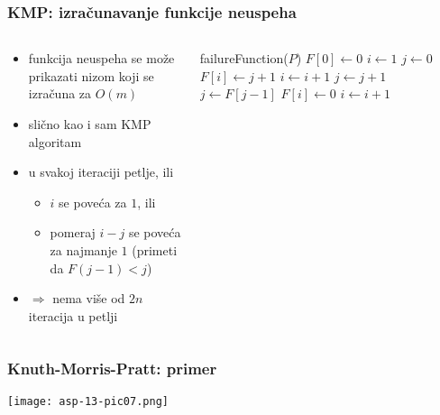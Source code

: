 \documentclass[compress,aspectratio=169]{beamer}
\begin{document}
\begin{frame}[fragile,shrink=12]
  \frametitle{KMP: izračunavanje funkcije neuspeha}
  \begin{columns}
    \begin{column}[t]{8cm}
      \begin{itemize}
        \item funkcija neuspeha se može prikazati nizom koji se izračuna za $O(m)$
        \item slično kao i sam KMP algoritam
        \item u svakoj iteraciji petlje, ili
        \begin{itemize}
          \item $i$ se poveća za $1$, ili
          \item pomeraj $i-j$ se poveća za najmanje $1$ (primeti da $F(j-1)<j$)
        \end{itemize}
        \item $\Rightarrow$ nema više od $2n$ iteracija u petlji
      \end{itemize}
    \end{column}
    \begin{column}[t]{8cm}
      \begin{algorithmic}
        \STATE failureFunction($P$)
        \STATE $F[0] \leftarrow 0$
        \STATE $i \leftarrow 1$
        \STATE $j \leftarrow 0$
            \STATE $F[i] \leftarrow j+1$ 
            \STATE $i \leftarrow i+1$
            \STATE $j \leftarrow j+1$
            \STATE $j \leftarrow F[j-1]$ 
          \ELSE
            \STATE $F[i] \leftarrow 0$ 
            \STATE $i \leftarrow i + 1$
          \ENDIF
        \ENDWHILE
      \end{algorithmic}    
    \end{column}
  \end{columns}
\end{frame}

\begin{frame}[fragile]
  \frametitle{Knuth-Morris-Pratt: primer}
  \begin{center}
    \texttt{[image: asp-13-pic07.png]}
  \end{center}
\end{frame}
\end{document}
